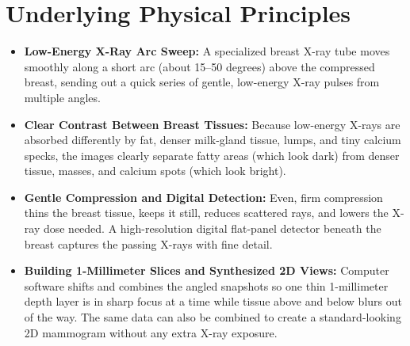 \section{Underlying Physical Principles}
\begin{itemize}
\item \textbf{Low-Energy X-Ray Arc Sweep:} A specialized breast X-ray tube moves smoothly along a short arc (about 15--50 degrees) above the compressed breast, sending out a quick series of gentle, low-energy X-ray pulses from multiple angles.
\item \textbf{Clear Contrast Between Breast Tissues:} Because low-energy X-rays are absorbed differently by fat, denser milk-gland tissue, lumps, and tiny calcium specks, the images clearly separate fatty areas (which look dark) from denser tissue, masses, and calcium spots (which look bright).
\item \textbf{Gentle Compression and Digital Detection:} Even, firm compression thins the breast tissue, keeps it still, reduces scattered rays, and lowers the X-ray dose needed. A high-resolution digital flat-panel detector beneath the breast captures the passing X-rays with fine detail.
\item \textbf{Building 1-Millimeter Slices and Synthesized 2D Views:} Computer software shifts and combines the angled snapshots so one thin 1-millimeter depth layer is in sharp focus at a time while tissue above and below blurs out of the way. The same data can also be combined to create a standard-looking 2D mammogram without any extra X-ray exposure.
\end{itemize}


